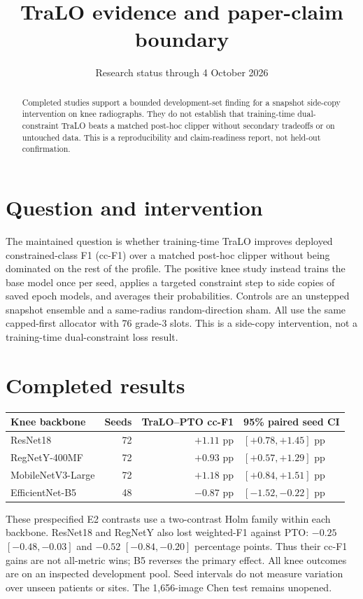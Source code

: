 \documentclass[11pt,a4paper]{article}
\title{TraLO evidence and paper-claim boundary}
\author{Research status through 4 October 2026}
\date{}
\begin{document}
\maketitle
\begin{abstract}
Completed studies support a bounded development-set finding for a
snapshot side-copy intervention on knee radiographs. They do not
establish that training-time dual-constraint TraLO beats a matched
post-hoc clipper without secondary tradeoffs or on untouched data.
This is a reproducibility and claim-readiness report, not held-out confirmation.
\end{abstract}

\section{Question and intervention}
The maintained question is whether training-time TraLO improves
deployed constrained-class F1 (cc-F1) over a matched post-hoc clipper
without being dominated on the rest of the profile. The positive knee
study instead trains the base model once per seed, applies a targeted
constraint step to side copies of saved epoch models, and averages
their probabilities. Controls are an unstepped snapshot ensemble and
a same-radius random-direction sham. All use the same capped-first
allocator with 76 grade-3 slots. This is a side-copy intervention,
not a training-time dual-constraint loss result.

\section{Completed results}
\begin{center}
\small
\begin{tabular}{lrrl}
\toprule
Knee backbone & Seeds & TraLO--PTO cc-F1 & 95\% paired seed CI \\
\midrule
ResNet18 & 72 & $+1.11$ pp & $[+0.78,+1.45]$ pp \\
RegNetY-400MF & 72 & $+0.93$ pp & $[+0.57,+1.29]$ pp \\
MobileNetV3-Large & 72 & $+1.18$ pp & $[+0.84,+1.51]$ pp \\
EfficientNet-B5 & 48 & $-0.87$ pp & $[-1.52,-0.22]$ pp \\
\bottomrule
\end{tabular}
\end{center}
These prespecified E2 contrasts use a two-contrast Holm family within
each backbone. ResNet18 and RegNetY also lost weighted-F1 against PTO:
$-0.25$ $[-0.48,-0.03]$ and $-0.52$ $[-0.84,-0.20]$
percentage points. Thus their cc-F1 gains are not all-metric wins;
B5 reverses the primary effect. All knee outcomes are on an inspected
development pool. Seed intervals do not measure variation over unseen
patients or sites. The 1,656-image Chen test remains unopened.
\end{document}
